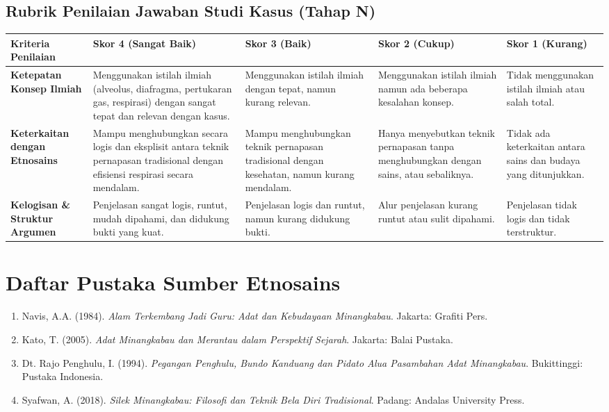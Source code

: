 \documentclass[a4paper,12pt]{article}
\begin{document}
\subsection{Rubrik Penilaian Jawaban Studi Kasus (Tahap N)}

\begin{longtable}{|p{3cm}|p{3cm}|p{3cm}|p{3cm}|p{3cm}|}
\hline
\textbf{Kriteria Penilaian} & \textbf{Skor 4 (Sangat Baik)} & \textbf{Skor 3 (Baik)} & \textbf{Skor 2 (Cukup)} & \textbf{Skor 1 (Kurang)} \\
\hline
\textbf{Ketepatan Konsep Ilmiah} & Menggunakan istilah ilmiah (alveolus, diafragma, pertukaran gas, respirasi) dengan sangat tepat dan relevan dengan kasus. & Menggunakan istilah ilmiah dengan tepat, namun kurang relevan. & Menggunakan istilah ilmiah namun ada beberapa kesalahan konsep. & Tidak menggunakan istilah ilmiah atau salah total. \\
\hline
\textbf{Keterkaitan dengan Etnosains} & Mampu menghubungkan secara logis dan eksplisit antara teknik pernapasan tradisional dengan efisiensi respirasi secara mendalam. & Mampu menghubungkan teknik pernapasan tradisional dengan kesehatan, namun kurang mendalam. & Hanya menyebutkan teknik pernapasan tanpa menghubungkan dengan sains, atau sebaliknya. & Tidak ada keterkaitan antara sains dan budaya yang ditunjukkan. \\
\hline
\textbf{Kelogisan \& Struktur Argumen} & Penjelasan sangat logis, runtut, mudah dipahami, dan didukung bukti yang kuat. & Penjelasan logis dan runtut, namun kurang didukung bukti. & Alur penjelasan kurang runtut atau sulit dipahami. & Penjelasan tidak logis dan tidak terstruktur. \\
\hline
\end{longtable}

\section{Daftar Pustaka Sumber Etnosains}

\begin{enumerate}
\item Navis, A.A. (1984). \textit{Alam Terkembang Jadi Guru: Adat dan Kebudayaan Minangkabau}. Jakarta: Grafiti Pers.
\item Kato, T. (2005). \textit{Adat Minangkabau dan Merantau dalam Perspektif Sejarah}. Jakarta: Balai Pustaka.
\item Dt. Rajo Penghulu, I. (1994). \textit{Pegangan Penghulu, Bundo Kanduang dan Pidato Alua Pasambahan Adat Minangkabau}. Bukittinggi: Pustaka Indonesia.
\item Syafwan, A. (2018). \textit{Silek Minangkabau: Filosofi dan Teknik Bela Diri Tradisional}. Padang: Andalas University Press.
\end{enumerate}
\end{document}
